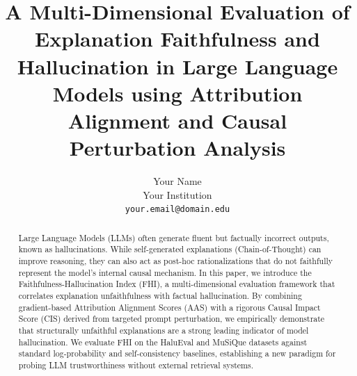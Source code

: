 \documentclass[10pt,twocolumn,letterpaper]{article}
\begin{document}
\title{A Multi-Dimensional Evaluation of Explanation Faithfulness and Hallucination in Large Language Models using Attribution Alignment and Causal Perturbation Analysis}

\author{Your Name\\
Your Institution\\
{\tt\small your.email@domain.edu}
}

\maketitle

\begin{abstract}
Large Language Models (LLMs) often generate fluent but factually incorrect outputs, known as hallucinations. While self-generated explanations (Chain-of-Thought) can improve reasoning, they can also act as post-hoc rationalizations that do not faithfully represent the model's internal causal mechanism. In this paper, we introduce the Faithfulness-Hallucination Index (FHI), a multi-dimensional evaluation framework that correlates explanation unfaithfulness with factual hallucination. By combining gradient-based Attribution Alignment Scores (AAS) with a rigorous Causal Impact Score (CIS) derived from targeted prompt perturbation, we empirically demonstrate that structurally unfaithful explanations are a strong leading indicator of model hallucination. We evaluate FHI on the HaluEval and MuSiQue datasets against standard log-probability and self-consistency baselines, establishing a new paradigm for probing LLM trustworthiness without external retrieval systems.
\end{abstract}








{\small


}
\end{document}
